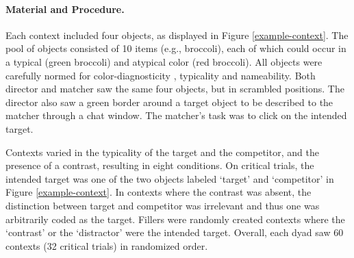 \documentclass[10pt,letterpaper]{article}
\newcommand{\figref}[1]{Figure \ref{#1}}
\begin{document}


\paragraph{Material and Procedure.} Each context included four objects, as displayed in \figref{example-context}. The pool of objects consisted of 10 items (e.g., broccoli), each of which could occur in a typical (green broccoli) and atypical color (red broccoli). All objects were carefully normed for color-diagnosticity \cite{Tanaka:1999}, typicality and nameability. Both director and matcher saw the same four objects, but in scrambled positions. The director also saw a green border around a target object to be described to the matcher through a chat window. The matcher's task was to click on the intended target.


Contexts varied in the typicality of the target and the competitor, and the presence of a contrast, resulting in eight conditions. On critical trials, the  intended target was one of the two objects labeled `target' and `competitor' in \figref{example-context}. In contexts where the contrast was absent, the distinction between target and competitor was irrelevant and thus one was arbitrarily coded as the target. Fillers were randomly created contexts where the `contrast' or the `distractor' were the intended target. Overall, each dyad saw 60 contexts (32 critical trials) in randomized order.
\end{document}
